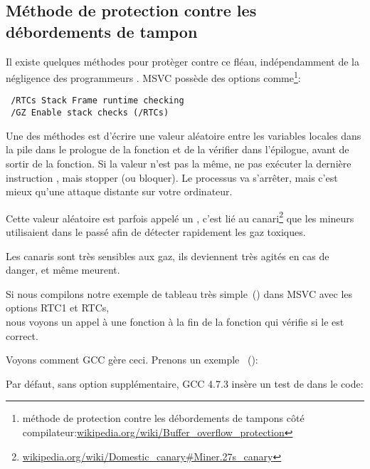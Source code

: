 \subsection{Méthode de protection contre les débordements de tampon}
\label{subsec:BO_protection}

Il existe quelques méthodes pour protèger contre ce fléau, indépendamment de la négligence
des programmeurs \CCpp.
MSVC possède des options comme\footnote{méthode de protection contre les débordements
de tampons côté compilateur:\href{http://go.yurichev.com/17133}{wikipedia.org/wiki/Buffer\_overflow\_protection}}:

\begin{lstlisting}
 /RTCs Stack Frame runtime checking
 /GZ Enable stack checks (/RTCs)
\end{lstlisting}


Une des méthodes est d'écrire une valeur aléatoire entre les variables locales dans
la pile dans le prologue de la fonction et de la vérifier dans l'épilogue, avant de
sortir de la fonction.
Si la valeur n'est pas la même, ne pas exécuter la dernière instruction \RET, mais
stopper (ou bloquer).
Le processus va s'arrêter, mais c'est mieux qu'une attaque distante sur votre ordinateur.
    
\newcommand{\CANARYURL}{\href{http://go.yurichev.com/17134}{wikipedia.org/wiki/Domestic\_canary\#Miner.27s\_canary}}


Cette valeur aléatoire est parfois appelé un , c'est lié au canari\footnote{\CANARYURL}
que les mineurs utilisaient dans le passé afin de détecter rapidement les gaz toxiques.

Les canaris sont très sensibles aux gaz, ils deviennent très agités en cas de danger,
et même meurent.

Si nous compilons notre exemple de tableau très simple~() dans
\ac{MSVC} avec les options RTC1 et RTCs,\\
nous voyons un appel à  une fonction à la fin de la
fonction qui vérifie si le  est correct.

Voyons comment GCC gère ceci.
Prenons un exemple ~():



Par défaut, sans option supplémentaire, GCC 4.7.3 insère un test de   dans
le code:

